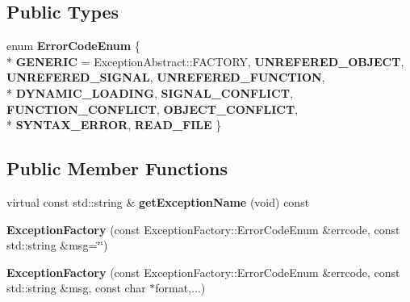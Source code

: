\subsection*{Public Types}
\begin{DoxyCompactItemize}
\item 
enum {\bfseries Error\+Code\+Enum} \{ \\*
{\bfseries G\+E\+N\+E\+R\+IC} = Exception\+Abstract\+:\+:F\+A\+C\+T\+O\+RY, 
{\bfseries U\+N\+R\+E\+F\+E\+R\+E\+D\+\_\+\+O\+B\+J\+E\+CT}, 
{\bfseries U\+N\+R\+E\+F\+E\+R\+E\+D\+\_\+\+S\+I\+G\+N\+AL}, 
{\bfseries U\+N\+R\+E\+F\+E\+R\+E\+D\+\_\+\+F\+U\+N\+C\+T\+I\+ON}, 
\\*
{\bfseries D\+Y\+N\+A\+M\+I\+C\+\_\+\+L\+O\+A\+D\+I\+NG}, 
{\bfseries S\+I\+G\+N\+A\+L\+\_\+\+C\+O\+N\+F\+L\+I\+CT}, 
{\bfseries F\+U\+N\+C\+T\+I\+O\+N\+\_\+\+C\+O\+N\+F\+L\+I\+CT}, 
{\bfseries O\+B\+J\+E\+C\+T\+\_\+\+C\+O\+N\+F\+L\+I\+CT}, 
\\*
{\bfseries S\+Y\+N\+T\+A\+X\+\_\+\+E\+R\+R\+OR}, 
{\bfseries R\+E\+A\+D\+\_\+\+F\+I\+LE}
 \}\hypertarget{classdynamic__graph_1_1ExceptionFactory_a61ed67b84bf03809ef3d6b4124e4c39d}{}\label{classdynamic__graph_1_1ExceptionFactory_a61ed67b84bf03809ef3d6b4124e4c39d}

\end{DoxyCompactItemize}
\subsection*{Public Member Functions}
\begin{DoxyCompactItemize}
\item 
virtual const std\+::string \& {\bfseries get\+Exception\+Name} (void) const \hypertarget{classdynamic__graph_1_1ExceptionFactory_ad7b2f2a7bf8dc47d3e5221e6c0b3a8ab}{}\label{classdynamic__graph_1_1ExceptionFactory_ad7b2f2a7bf8dc47d3e5221e6c0b3a8ab}

\item 
{\bfseries Exception\+Factory} (const Exception\+Factory\+::\+Error\+Code\+Enum \&errcode, const std\+::string \&msg=\char`\"{}\char`\"{})\hypertarget{classdynamic__graph_1_1ExceptionFactory_a761ecdb7e256d8e08ef57d8a30aa0304}{}\label{classdynamic__graph_1_1ExceptionFactory_a761ecdb7e256d8e08ef57d8a30aa0304}

\item 
{\bfseries Exception\+Factory} (const Exception\+Factory\+::\+Error\+Code\+Enum \&errcode, const std\+::string \&msg, const char $\ast$format,...)\hypertarget{classdynamic__graph_1_1ExceptionFactory_a7cf2af98062079786409dc9a2dcfd85a}{}\label{classdynamic__graph_1_1ExceptionFactory_a7cf2af98062079786409dc9a2dcfd85a}

\end{DoxyCompactItemize}
